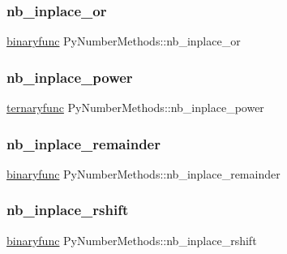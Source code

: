 \subsubsection{\texorpdfstring{nb\_inplace\_or}{nb\_inplace\_or}}
{\footnotesize\ttfamily \mbox{\hyperlink{_python27_2object_8h_a1a50b2d154f36acb9d215f2cdc1561a8}{binaryfunc}} Py\+Number\+Methods\+::nb\+\_\+inplace\+\_\+or}

\mbox{\label{struct_py_number_methods_a02023c70f79944ff3e781611dbee9026}} 
\subsubsection{\texorpdfstring{nb\_inplace\_power}{nb\_inplace\_power}}
{\footnotesize\ttfamily \mbox{\hyperlink{_python27_2object_8h_a3304ec7aa95ae9f0141c3b04e20f8394}{ternaryfunc}} Py\+Number\+Methods\+::nb\+\_\+inplace\+\_\+power}

\mbox{\label{struct_py_number_methods_ab97168bbc3fd66e4908a402e5661d2e3}} 
\subsubsection{\texorpdfstring{nb\_inplace\_remainder}{nb\_inplace\_remainder}}
{\footnotesize\ttfamily \mbox{\hyperlink{_python27_2object_8h_a1a50b2d154f36acb9d215f2cdc1561a8}{binaryfunc}} Py\+Number\+Methods\+::nb\+\_\+inplace\+\_\+remainder}

\mbox{\label{struct_py_number_methods_aa5240cc9ef3ec51027e01144b7daf143}} 
\subsubsection{\texorpdfstring{nb\_inplace\_rshift}{nb\_inplace\_rshift}}
{\footnotesize\ttfamily \mbox{\hyperlink{_python27_2object_8h_a1a50b2d154f36acb9d215f2cdc1561a8}{binaryfunc}} Py\+Number\+Methods\+::nb\+\_\+inplace\+\_\+rshift}

